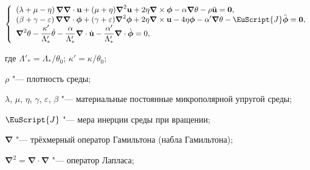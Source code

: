 \begin{equation}

\label{kosygina:eq_motion1}

\left\{\begin{array}{l}

\displaystyle{\left(\lambda+\mu-\eta\right)\boldsymbol

\nabla\boldsymbol \nabla\cdot\mathbf{ u}+(\mu+\eta)\boldsymbol

\nabla^{2}\mathbf{ u}+2\eta\boldsymbol \nabla\times

\boldsymbol\phi-\alpha\boldsymbol \nabla\theta-\rho \ddot{\mathbf{ u}}= \mathbf{ 0},}\\

\displaystyle{\left(\beta+\gamma-\varepsilon\right)\boldsymbol

\nabla\boldsymbol

\nabla\cdot\boldsymbol\phi+(\gamma+\varepsilon)\boldsymbol\nabla^{2}\boldsymbol\phi+2\eta\boldsymbol

\nabla\times \mathbf{ u}-4\eta\boldsymbol\phi-\alpha ' \boldsymbol

\nabla\theta-

\EuScript{J}\ddot{\boldsymbol\phi}= \mathbf{ 0},}\\

\displaystyle{

\boldsymbol\nabla^{2}\theta-\frac{\kappa'}{\Lambda'_{*}}\dot{\theta}-\frac{\alpha}{\Lambda'_{*}}\boldsymbol

\nabla\cdot\dot{ \mathbf{ u}}-\frac{\alpha'

}{\Lambda'_{*}}\boldsymbol \nabla\cdot\dot {\boldsymbol\phi}=0,}

\end{array}\right.

\end{equation}

где $ \Lambda'_{*}=\Lambda_{*}/\theta_{0}$; $\kappa'=\kappa/\theta_{0}$; 

$\rho$ "--- плотность среды;

$\lambda$, $\mu$, $\eta$, $\gamma$, $\varepsilon$, $\beta$ "--- материальные постоянные микрополярной упругой среды; 

$\EuScript{J}$ "--- мера инерции среды при вращении; 

$\boldsymbol \nabla$ "--- трёхмерный оператор Гамильтона (набла Гамильтона);

$\boldsymbol\nabla^{2}=\boldsymbol \nabla\cdot\boldsymbol \nabla$ "--- оператор Лапласа; 

